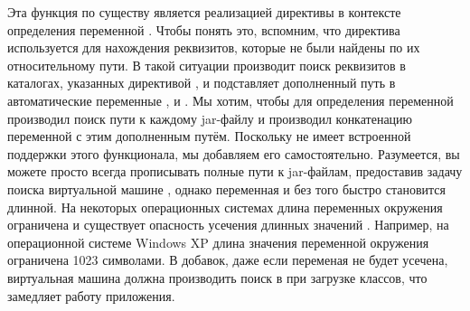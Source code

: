 Эта функция по существу является реализацией директивы
 в контексте определения переменной
. Чтобы понять это, вспомним, что директива
 используется \GNUmake{} для нахождения реквизитов,
которые не были найдены по их относительному пути. В такой
ситуации \GNUmake{} производит поиск реквизитов в каталогах, указанных
директивой , и подставляет дополненный путь в
автоматические переменные \variable{\$\^},  и
\variable{\$+}. Мы хотим, чтобы для определения переменной
 \GNUmake{} производил поиск пути к каждому
jar\hyp{}файлу и производил конкатенацию переменной
 с этим дополненным путём. Поскольку \GNUmake{} не
имеет встроенной поддержки этого функционала, мы добавляем его
самостоятельно.  Разумеется, вы можете просто всегда прописывать
полные пути к jar\hyp{}файлам, предоставив задачу поиска виртуальной
машине \Java{}, однако переменная  и без того
быстро становится длинной. На некоторых операционных системах длина
переменных окружения ограничена и существует опасность усечения
длинных значений .  Например, на операционной
системе Windows XP длина значения переменной окружения ограничена 1023
символами. В добавок, даже если переменая  не
будет усечена, виртуальная машина \Java{} должна производить поиск в
 при загрузке классов, что замедляет работу
приложения.
